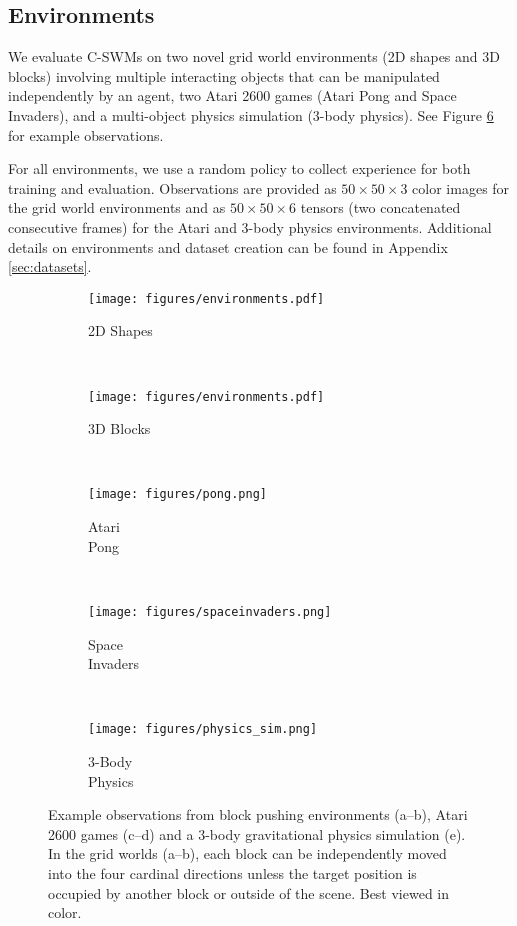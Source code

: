 \documentclass{article} %
\begin{document}
\subsection{Environments}
We evaluate C-SWMs on two novel grid world environments (2D shapes and 3D blocks) involving multiple interacting objects that can be manipulated independently by an agent, two Atari 2600 games (Atari Pong and Space Invaders), and a multi-object physics simulation (3-body physics). See Figure \ref{fig:environments} for example observations.

For all environments, we use a random policy to collect experience for both training and evaluation. Observations are provided as $50\times50\times3$ color images for the grid world environments and as $50\times50\times6$ tensors (two concatenated consecutive frames) for the Atari and 3-body physics environments. Additional details on environments and dataset creation can be found in Appendix \ref{sec:datasets}.


\begin{figure}[htp!]
\centering
  \begin{subfigure}[b]{0.24\textwidth}
  \centering
  \texttt{[image: figures/environments.pdf]}
  \caption{2D Shapes\label{fig:environments_a}}
  \end{subfigure}
  ~
  \begin{subfigure}[b]{0.26\textwidth}
  \centering
  \texttt{[image: figures/environments.pdf]}
  \caption{3D Blocks\label{fig:environments_b}}
  \end{subfigure}
  ~
    \begin{subfigure}[b]{0.14\textwidth}
  \centering
  \captionsetup{justification=centering}
  \texttt{[image: figures/pong.png]}
  \caption{Atari\\Pong\label{fig:environments_c}}
  \end{subfigure}
  ~
    \begin{subfigure}[b]{0.14\textwidth}
  \centering
  \captionsetup{justification=centering}
  \texttt{[image: figures/spaceinvaders.png]}
  \caption{Space\\Invaders\label{fig:environments_d}}
  \end{subfigure}
  ~
    \begin{subfigure}[b]{0.14\textwidth}
  \centering
  \captionsetup{justification=centering}
  \texttt{[image: figures/physics\_sim.png]}\\[0.18em]
  \caption{3-Body\\Physics\label{fig:environments_e}}
  \end{subfigure}
  \caption{Example observations from block pushing environments (a--b), Atari 2600 games (c--d) and a 3-body gravitational physics simulation (e). In the grid worlds (a--b), each block can be independently moved into the four cardinal directions unless the target position is occupied by another block or outside of the scene. Best viewed in color.\label{fig:environments}}
\end{figure}
\end{document}
